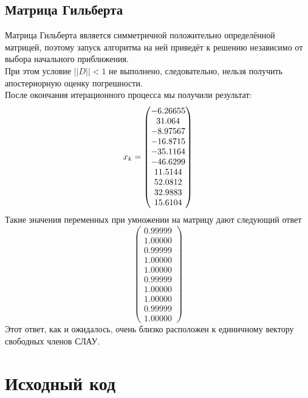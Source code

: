\documentclass[../../report.tex]{subfiles}
\begin{document}
\subsection{Матрица Гильберта}
Матрица Гильберта является симметричной положительно определённой 
матрицей, поэтому запуск алгоритма на ней приведёт к решению 
независимо от выбора начального приближения. \\
При этом условие $||D|| < 1$ не выполнено, следовательно, нельзя получить апостериорную оценку погрешности. \\
После окончания итерационного процесса мы получили результат:
\[
x_k = \begin{pmatrix} -6.26655 \\ 31.064 \\ -8.97567 \\ -16.8715 \\ -35.1164 \\ -46.6299 \\ 11.5144 \\ 52.0812 \\ 32.9883 \\ 15.6104 \end{pmatrix}
\]
Такие значения переменных при умножении на матрицу дают следующий ответ
\[
\begin{pmatrix}
  0.99999 \\
  1.00000 \\
  0.99999 \\
  1.00000 \\
  1.00000 \\
  0.99999 \\
  1.00000 \\
  1.00000 \\
  0.99999 \\
  1.00000
\end{pmatrix}
\]
Этот ответ, как и ожидалось, очень близко расположен к единичному вектору свободных членов СЛАУ.

\section{Исходный код}
\end{document}
